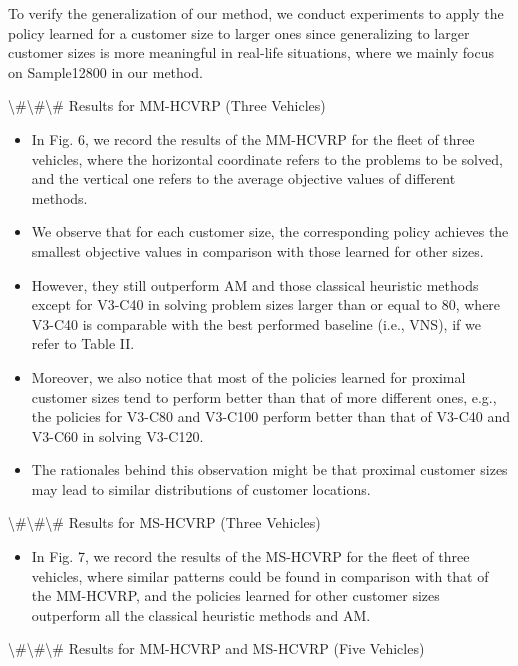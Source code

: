 \documentclass{article}
\begin{document}
	To verify the generalization of our method, we conduct experiments to apply the policy learned for a customer size to larger ones since generalizing to larger customer sizes is more meaningful in real-life situations, where we mainly focus on Sample12800 in our method.
	
	\textbackslash{}#\textbackslash{}#\textbackslash{}# Results for MM-HCVRP (Three Vehicles)
	
	\begin{itemize}
		\item In Fig. 6, we record the results of the MM-HCVRP for the fleet of three vehicles, where the horizontal coordinate refers to the problems to be solved, and the vertical one refers to the average objective values of different methods.
		\item We observe that for each customer size, the corresponding policy achieves the smallest objective values in comparison with those learned for other sizes.
		\item However, they still outperform AM and those classical heuristic methods except for V3-C40 in solving problem sizes larger than or equal to 80, where V3-C40 is comparable with the best performed baseline (i.e., VNS), if we refer to Table II.
		\item Moreover, we also notice that most of the policies learned for proximal customer sizes tend to perform better than that of more different ones, e.g., the policies for V3-C80 and V3-C100 perform better than that of V3-C40 and V3-C60 in solving V3-C120.
		\item The rationales behind this observation might be that proximal customer sizes may lead to similar distributions of customer locations.
	\end{itemize}
	
	\textbackslash{}#\textbackslash{}#\textbackslash{}# Results for MS-HCVRP (Three Vehicles)
	
	\begin{itemize}
		\item In Fig. 7, we record the results of the MS-HCVRP for the fleet of three vehicles, where similar patterns could be found in comparison with that of the MM-HCVRP, and the policies learned for other customer sizes outperform all the classical heuristic methods and AM.
	\end{itemize}
	
	\textbackslash{}#\textbackslash{}#\textbackslash{}# Results for MM-HCVRP and MS-HCVRP (Five Vehicles)
	
\end{document}
